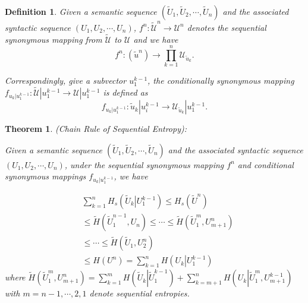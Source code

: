 \documentclass[12pt, draftclsnofoot,onecolumn]{IEEEtran}
\newtheorem{theorem}{\bf{Theorem}}
\newtheorem{definition}{\bf{Definition}}
\begin{document}
\begin{definition}
Given a semantic sequence $(\tilde {U}_1,\tilde {U}_2,\cdots,\tilde {U}_n)$ and the associated syntactic sequence $\left(U_1,U_2,\cdots,U_n\right)$, $f^n: \tilde{\mathcal{U}}^n\to\mathcal{U}^n$ denotes the sequential synonymous mapping from $\tilde {\mathcal{U}}$ to $\mathcal{U}$ and we have
\begin{equation}
f^n: (\tilde{u}^n) \to \prod_{k=1}^{n} \mathcal{U}_{\tilde{u}_k}.
\end{equation}

Correspondingly, give a subvector $u_1^{k-1}$, the conditionally synonymous mapping $f_{u_k|u_1^{k-1}}: \tilde {\mathcal{U}}|u_1^{k-1} \to \mathcal{U}|u_1^{k-1}$ is defined as
\begin{equation}
f_{u_k|u_1^{k-1}}: \tilde{u}_{k}|u_i^{k-1} \to \mathcal{U}_{\tilde{u}_k}|u_1^{k-1}.
\end{equation}
\end{definition}


\begin{theorem}\label{theorem_chainrule}
(\textit{Chain Rule of Sequential Entropy}):

Given a semantic sequence $(\tilde {U}_1,\tilde {U}_2,\cdots,\tilde {U}_n)$ and the associated syntactic sequence $\left(U_1,U_2,\cdots,U_n\right)$, under the sequential synonymous mapping $f^n$ and conditional synonymous mappings $f_{u_k|u_1^{k-1}}$, we have

\begin{equation}
\begin{aligned}
&\sum_{k=1}^{n} H_s(\tilde{U}_k\left|U_1^{k-1}\right.) \leq H_s(\tilde{U}^n)\\
&\leq \tilde{H}(\tilde{U}_1^{n-1},U_{n}) \leq \cdots \leq \tilde{H}(\tilde{U}_1^m,U_{m+1}^n) \\
&\leq \cdots \leq \tilde{H}(\tilde{U}_1,U_{2}^n)\\
& \leq H(U^n)=\sum_{k=1}^{n} H(U_k\left|U_1^{k-1}\right.)
\end{aligned}
\end{equation}
where $\tilde{H}(\tilde{U}_1^m,U_{m+1}^n) =\sum_{k=1}^{m} H(\tilde{U}_k\left|\tilde{U}_1^{k-1}\right.)+\sum_{k=m+1}^{n} H(U_k\left|\tilde{U}_1^{m},U_{m+1}^{k-1}\right.)$ with $m=n-1,\cdots,2,1$ denote sequential entropies.

\end{theorem}
\end{document}
